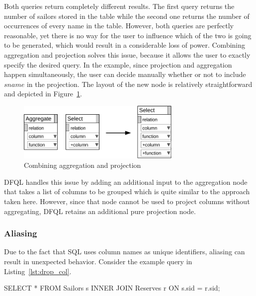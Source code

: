 \documentclass[11pt,a4paper]{globis-book}
\begin{document}
Both queries return completely different results. The first query returns the number of sailors stored in the table while the second one returns the number of occurrences of every name in the table. However, both queries are perfectly reasonable, yet there is no way for the user to influence which of the two is going to be generated, which would result in a considerable loss of power. Combining aggregation and projection solves this issue, because it allows the user to exactly specify the desired query. In the example, since projection and aggregation happen simultaneously, the user can decide manually whether or not to include $sname$ in the projection. The layout of the new node is relatively straightforward and depicted in Figure~\ref{fig:select_new}.

\begin{figure}[h]
  \centering
  \includegraphics[width=0.7\textwidth]{resources/SelectNew.pdf}
  \caption{Combining aggregation and projection}
  \label{fig:select_new}
\end{figure}

DFQL handles this issue by adding an additional input to the aggregation node that takes a list of columns to be grouped which is quite similar to the approach taken here. However, since that node cannot be used to project columns without aggregating, DFQL retains an additional pure projection node.

\subsubsection*{Aliasing}
\label{sec:aliasing}
Due to the fact that SQL uses column names as unique identifiers, aliasing can result in unexpected behavior. Consider the example query in Listing~\ref{lst:drop_col}.

\begin{codeex}[caption=Query that drops column on join, label=lst:drop_col]
SELECT *
FROM Sailors s INNER JOIN Reserves r ON s.sid = r.sid;
\end{codeex}
\end{document}
